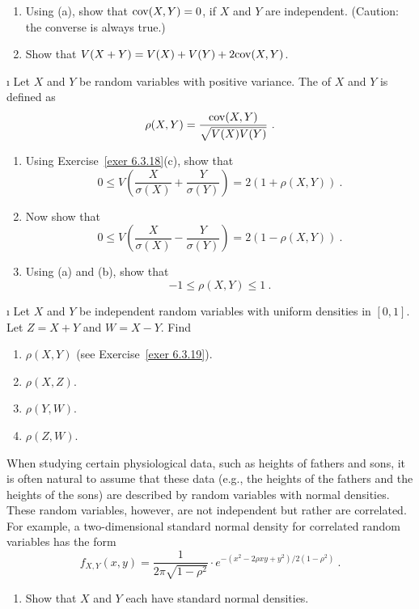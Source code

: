 {\begin{LJSItem}
\begin{enumerate}
\item Using (a), show that ${\rm cov}(X,Y) = 0$, if
$X$ and $Y$ are independent.  (Caution: the converse is   always true.)

\item Show that $V(X + Y) = V(X) + V(Y) + 2{\rm cov}(X,Y)$.
\end{enumerate}

\i\label{exer 6.3.19} Let $X$ and $Y$ be random variables with positive variance. 
The  of $X$ and $Y$ is defined as
$$
\rho(X,Y) = \frac{{\rm cov}(X,Y)}{\sqrt{V(X)V(Y)}}\ .
$$
\begin{enumerate}
\item Using Exercise~\ref{exer 6.3.18}(c), show that
$$ 0 \leq V\left( \frac X{\sigma(X)} + \frac Y{\sigma(Y)} \right) = 2(1 +
\rho(X,Y))\ .
$$

\item Now show that
$$ 0 \leq V\left( \frac X{\sigma(X)} - \frac Y{\sigma(Y)} \right) = 2(1 -
\rho(X,Y))\ .
$$

\item Using (a) and (b), show that
$$ -1 \leq \rho(X,Y) \leq 1\ .
$$
\end{enumerate}

\i\label{exer 6.3.20} Let $X$ and $Y$ be independent random variables with uniform
densities in $[0,1]$.  Let $Z = X + Y$ and $W = X - Y$.  Find

\begin{enumerate}
\item $\rho(X,Y)$ (see Exercise~\ref{exer 6.3.19}).

\item $\rho(X,Z)$.

\item $\rho(Y,W)$.

\item $\rho(Z,W)$.
\end{enumerate}

\istar\label{exer 6.3.21} When studying certain physiological data, such as heights
of fathers and sons, it is often natural to assume that these data (e.g., the heights
of the fathers and the heights of the sons) are described by random variables with
normal densities.  These random variables, however, are not independent but rather
are correlated.  For example, a two-dimensional standard normal density for
correlated random variables has the form
$$ f_{X,Y}(x,y) = \frac 1{2\pi\sqrt{1 - \rho^2}} \cdot e^{-(x^2 - 2\rho xy + y^2)/2(1
- \rho^2)}\ .
$$
\begin{enumerate}
\item Show that $X$ and $Y$ each have standard normal densities.


\end{enumerate}
\end{LJSItem}}
